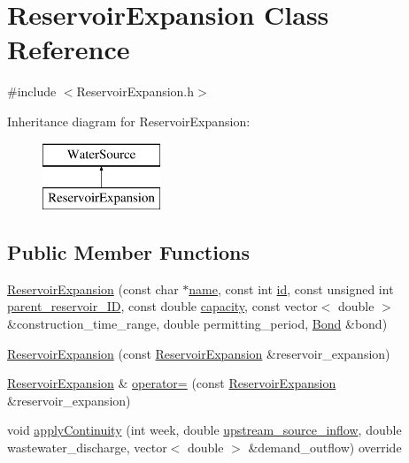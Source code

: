\hypertarget{classReservoirExpansion}{}\section{Reservoir\+Expansion Class Reference}
\label{classReservoirExpansion}


{\ttfamily \#include $<$Reservoir\+Expansion.\+h$>$}

Inheritance diagram for Reservoir\+Expansion\+:\begin{figure}[H]
\begin{center}
\leavevmode
\includegraphics[height=2.000000cm]{classReservoirExpansion}
\end{center}
\end{figure}
\subsection*{Public Member Functions}
\begin{DoxyCompactItemize}
\item 
\mbox{\hyperlink{classReservoirExpansion_aa742cae4276e97847681dac4f828b5ae_aa742cae4276e97847681dac4f828b5ae}{Reservoir\+Expansion}} (const char $\ast$\mbox{\hyperlink{classWaterSource_a846ea74c5b453d014f594d41fee8c765_a846ea74c5b453d014f594d41fee8c765}{name}}, const int \mbox{\hyperlink{classWaterSource_a6eafe5dfefd317877d1244e8a7c6e742_a6eafe5dfefd317877d1244e8a7c6e742}{id}}, const unsigned int \mbox{\hyperlink{classReservoirExpansion_a56527196174404cfed20b863df2ab0ba_a56527196174404cfed20b863df2ab0ba}{parent\+\_\+reservoir\+\_\+\+ID}}, const double \mbox{\hyperlink{classWaterSource_a2ec257b415b248214a8bce7fc5267723_a2ec257b415b248214a8bce7fc5267723}{capacity}}, const vector$<$ double $>$ \&construction\+\_\+time\+\_\+range, double permitting\+\_\+period, \mbox{\hyperlink{classBond}{Bond}} \&bond)
\item 
\mbox{\hyperlink{classReservoirExpansion_abc10a6725f7fb85b7478fb6b0b79bd1e_abc10a6725f7fb85b7478fb6b0b79bd1e}{Reservoir\+Expansion}} (const \mbox{\hyperlink{classReservoirExpansion}{Reservoir\+Expansion}} \&reservoir\+\_\+expansion)
\item 
\mbox{\hyperlink{classReservoirExpansion}{Reservoir\+Expansion}} \& \mbox{\hyperlink{classReservoirExpansion_af197058813986b16c34ae206c04e14bf_af197058813986b16c34ae206c04e14bf}{operator=}} (const \mbox{\hyperlink{classReservoirExpansion}{Reservoir\+Expansion}} \&reservoir\+\_\+expansion)
\item 
void \mbox{\hyperlink{classReservoirExpansion_a18614050354dced5cc2747eeda0c2397_a18614050354dced5cc2747eeda0c2397}{apply\+Continuity}} (int week, double \mbox{\hyperlink{classWaterSource_a7a69b2e9b6030f1035e6cf44d2918ee5_a7a69b2e9b6030f1035e6cf44d2918ee5}{upstream\+\_\+source\+\_\+inflow}}, double wastewater\+\_\+discharge, vector$<$ double $>$ \&demand\+\_\+outflow) override
\end{DoxyCompactItemize}
